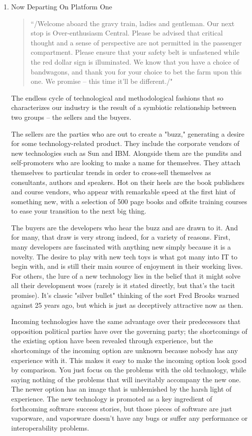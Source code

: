 \documentclass{article}
\begin{document}
\begin{enumerate}
\item Now Departing On Platform One
\label{sec:orgheadline418}

\begin{quote}
“/Welcome aboard the gravy train, ladies and gentleman. Our next stop
is Over-enthusiasm Central. Please be advised that critical thought
and a sense of perspective are not permitted in the passenger
compartment. Please ensure that your safety belt is unfastened while
the red dollar sign is illuminated. We know that you have a choice of
bandwagons, and thank you for your choice to bet the farm upon this
one. We promise -- this time it'll be different./"
\end{quote}

The endless cycle of technological and methodological fashions that so
characterizes our industry is the result of a symbiotic relationship
between two groups -- the sellers and the buyers.

The sellers are the parties who are out to create a "buzz," generating a
desire for some technology-related product. They include the corporate
vendors of new technologies such as Sun and IBM. Alongside them are the
pundits and self-promoters who are looking to make a name for
themselves. They attach themselves to particular trends in order to
cross-sell themselves as consultants, authors and speakers. Hot on their
heels are the book publishers and course vendors, who appear with
remarkable speed at the first hint of something new, with a selection of
500 page books and offsite training courses to ease your transition to
the next big thing.

The buyers are the developers who hear the buzz and are drawn to it. And
for many, that draw is very strong indeed, for a variety of reasons.
First, many developers are fascinated with anything new simply because
it is a novelty. The desire to play with new tech toys is what got many
into IT to begin with, and is still their main source of enjoyment in
their working lives. For others, the lure of a new technology lies in
the belief that it might solve all their development woes (rarely is it
stated directly, but that's the tacit promise). It's classic "silver
bullet" thinking of the sort Fred Brooks warned against 25 years ago,
but which is just as deceptively attractive now as then.

Incoming technologies have the same advantage over their predecessors
that opposition political parties have over the governing party; the
shortcomings of the existing option have been revealed through
experience, but the shortcomings of the incoming option are unknown
because nobody has any experience with it. This makes it easy to make
the incoming option look good by comparison. You just focus on the
problems with the old technology, while saying nothing of the problems
that will inevitably accompany the new one. The newer option has an
image that is unblemished by the harsh light of experience. The new
technology is promoted as a key ingredient of forthcoming software
success stories, but those pieces of software are just vaporware, and
vaporware doesn't have any bugs or suffer any performance or
interoperability problems.


\end{enumerate}
\end{document}
